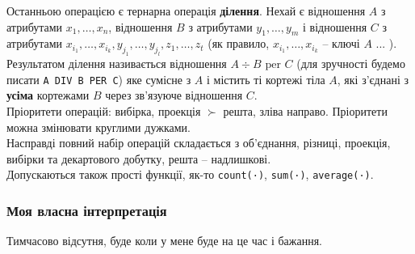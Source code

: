 Останньою операцією є тернарна операція \textbf{ділення}. Нехай є відношення $A$ з атрибутами $x_1, \ldots, x_n$, відношення $B$ з атрибутами $y_1, \ldots, y_m$ і відношення $C$ з атрибутами $x_{i_1}, \ldots, x_{i_k}, y_{j_1},\ldots, y_{j_l}, z_1, \ldots, z_t$ (як правило, $x_{i_1}, \ldots, x_{i_k}$ -- ключі $A$ ... ). Результатом ділення називається відношення $A \div B \text{ per } C$ (для зручності будемо писати \verb|A DIV B PER C|) яке сумісне з $A$ і містить ті кортежі тіла $A$, які з'єднані з \textbf{усіма} кортежами $B$ через зв'язуюче відношення $C$.\\

Пріоритети операцій: вибірка, проекція $\succ$ решта, зліва направо. Пріоритети можна змінювати круглими дужками. \\

Насправді повний набір операцій складається з об'єднання, різниці, проекція, вибірки та декартового добутку, решта -- надлишкові. \\

Допускаються також прості функції, як-то \verb|count(·)|, \verb|sum(·)|, \verb|average(·)|.

\subsubsection{Моя власна інтерпретація}
Тимчасово відсутня, буде коли у мене буде на це час і бажання.
